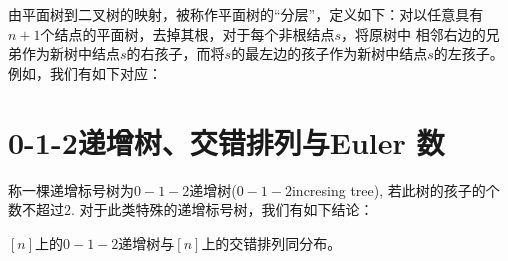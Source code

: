 \documentclass[a4paper,11pt]{article}
\begin{document}
由平面树到二叉树的映射，被称作平面树的“分层”，定义如下：对以任意具有$n+1$个结点的平面树，去掉其根，对于每个非根结点$s$，将原树中
相邻右边的兄弟作为新树中结点$s$的右孩子，而将$s$的最左边的孩子作为新树中结点$s$的左孩子。例如，我们有如下对应：






\section{0-1-2递增树、交错排列与Euler 数}
称一棵递增标号树为$0-1-2$递增树($0-1-2$incresing tree), 若此树的孩子的个数不超过$2$. 对于此类特殊的递增标号树，我们有如下结论：

{\thm $[n]$上的$0-1-2$递增树与$[n]$上的交错排列同分布。
}
\end{document}
